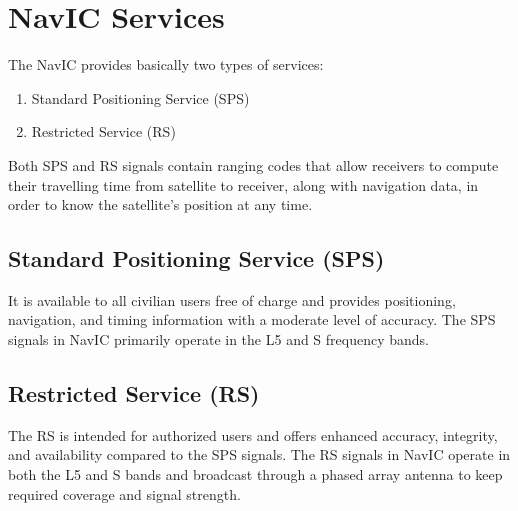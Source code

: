 \section{NavIC Services}
The NavIC provides basically two types of services:
	\begin{enumerate}
	\item Standard Positioning Service (SPS)
	\item Restricted Service (RS)
	\end{enumerate}
Both SPS and RS signals contain ranging codes that allow receivers to compute their travelling time from satellite to receiver, along with navigation data, in order to know the satellite’s position at any time. 
\subsection{Standard Positioning Service (SPS)}
	It is available to all civilian users free of charge and provides positioning, navigation, and timing information with a moderate level of accuracy. The SPS signals in NavIC primarily operate in the L5 and S frequency bands.
\subsection{Restricted Service (RS)}
The RS is intended for authorized users and offers enhanced accuracy, integrity, and availability compared to the SPS signals. The RS signals in NavIC operate in both the L5 and S bands and broadcast through a phased array antenna to keep required coverage and signal strength. 
%
